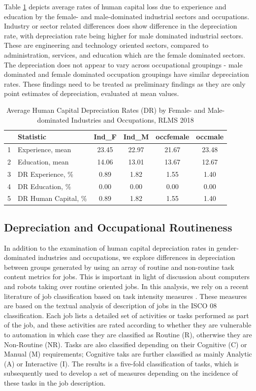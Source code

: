 \documentclass[12pt,a4paper]{article}
\numberwithin{equation}{section}
\begin{document}
Table \ref{tab:3.3} depicts average rates of human capital loss due to experience and education by the female- and male-dominated industrial sectors and occupations. Industry or sector related differences does show difference in the depreciation rate, with depreciation rate being higher for male dominated industrial sectors. These are engineering and technology oriented sectors, compared to administration, services, and education which are the female dominated sectors. The depreciation does not appear to vary across occupational groupings - male dominated and female dominated occupation groupings have similar depreciation rates. These findings need to be treated as preliminary findings as they are only point estimates of depreciation, evaluated at mean values. 

\begin{table}[H]
	\centering 
	\caption{Average Human Capital Depreciation Rates (DR) by Female- and Male-dominated Industries and Occupations, RLMS 2018} 
	\label{tab:3.3} 
	\begin{tabular}{clcccc}
		\hline
		& \textbf{Statistic} &\textbf{Ind\_F}& \textbf{Ind\_M} & \textbf{occfemale} & \textbf{occmale} \\ 
		\hline
		1 & Experience, mean  & 23.45 & 22.97 & 21.67 & 23.48 \\ 
		2 & Education, mean & 14.06 & 13.01 & 13.67 & 12.67 \\ 
		\midrule
		3 & DR Experience, \% & 0.89 & 1.82 & 1.55 & 1.40 \\ 
		4 & DR Education, \% & 0.00 & 0.00 & 0.00 & 0.00 \\ 
		5 & DR Human Capital, \% & 0.89 & 1.82 & 1.55 & 1.40 \\ 
		\hline
	\end{tabular}
\end{table} 


\subsection{Depreciation and Occupational Routineness}

In addition to the examination of human capital depreciation rates in gender-dominated industries and occupations, we explore differences in depreciation  between groups generated by using an array of routine and non-routine task content metrics for jobs. This is important in light of discussion about computers and robots taking over routine oriented jobs. In this analysis, we rely on a recent literature of job classification based on task intensity measures  \citet{mihaylov_152._2019}. These measures are based on the textual analysis of description of jobs in the ISCO 08 classification. Each job lists a detailed set of activities or tasks performed as part of the job, and these activities are rated according to whether they are vulnerable to automation in which case they are classified as Routine (R), otherwise they are Non-Routine (NR). Tasks are also classified depending on their Cognitive (C) or Manual (M) requirements; Cognitive taks are further classified as mainly Analytic (A) or Interactive (I). The results is a five-fold classification of tasks, which is subsequently used to develop a set of measures depending on the incidence of these tasks in the job description.
\end{document}
